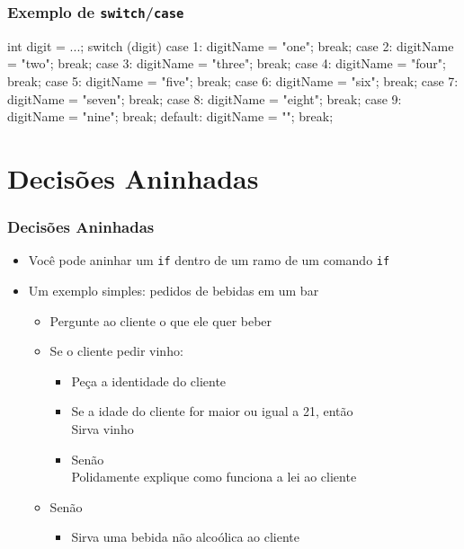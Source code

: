 \documentclass[xcolor={dvipsnames,table},aspectratio=169]{beamer}
\begin{document}
\begin{frame}[fragile]\frametitle{Exemplo de \texttt{switch}/\texttt{case}}
\begin{javacode}
int digit = ...;
switch (digit) {
  case 1: digitName = "one";   break;
  case 2: digitName = "two";   break;
  case 3: digitName = "three"; break;
  case 4: digitName = "four";  break;
  case 5: digitName = "five";  break;
  case 6: digitName = "six";   break;
  case 7: digitName = "seven"; break;
  case 8: digitName = "eight"; break;
  case 9: digitName = "nine";  break;
  default: digitName = "";     break;
}
\end{javacode}
\end{frame}

\section{Decisões Aninhadas}

\begin{frame}\frametitle{Decisões Aninhadas}
\begin{itemize}
	\item Você pode aninhar um \texttt{if} dentro de um ramo de um comando \texttt{if}
	\item Um exemplo simples: pedidos de bebidas em um bar
	\begin{itemize}
		\item Pergunte ao cliente o que ele quer beber
		\item Se o cliente pedir vinho:
		\begin{itemize}
			\item Peça a identidade do cliente
			\item Se a idade do cliente for maior ou igual a 21, então\\Sirva vinho
			\item Senão\\Polidamente explique como funciona a lei ao cliente 
		\end{itemize}
		\item Senão
		\begin{itemize}
			\item Sirva uma bebida não alcoólica ao cliente
		\end{itemize}
	\end{itemize}
\end{itemize}
\end{frame}
\end{document}
